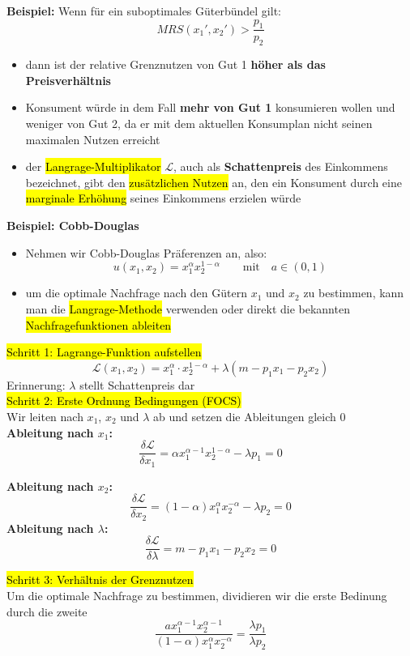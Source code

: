 \documentclass[a4paper, 10pt]{article}
\begin{document}
\textbf{Beispiel:}
Wenn für ein suboptimales Güterbündel gilt:
\[
    MRS(x_1',x_2') > \frac{p_1}{p_2}
\]
\begin{itemize}
    \item dann ist der relative Grenznutzen von Gut 1 \textbf{höher als das Preisverhältnis} 
    \item Konsument würde in dem Fall \textbf{mehr von Gut 1} konsumieren wollen und weniger von Gut 2, da er mit dem aktuellen Konsumplan nicht seinen maximalen Nutzen erreicht
    \item der \hl{Langrage-Multiplikator} $\mathcal{L}$, auch als \textbf{Schattenpreis} des Einkommens bezeichnet, gibt den \hl{zusätzlichen Nutzen} an, den ein Konsument durch eine \hl{marginale Erhöhung} seines Einkommens erzielen würde 
\end{itemize}
\textbf{Beispiel: Cobb-Douglas}
\begin{itemize}
    \item Nehmen wir Cobb-Douglas Präferenzen an, also:
    \[
        u(x_1,x_2) = x_1^\alpha x_2^{1- \alpha}   \qquad \text{mit} \quad a \in (0,1)
    \]

    \item um die optimale Nachfrage nach den Gütern $x_1$ und $x_2$ zu bestimmen, kann man die \hl{Langrage-Methode} verwenden oder direkt die bekannten \hl{Nachfragefunktionen ableiten}
\end{itemize}
\hl{Schritt 1: Lagrange-Funktion aufstellen}
\[
    \mathcal{L}(x_1,x_2) = x_1^\alpha \cdot x_2^{1- \alpha} + \lambda (m - p_1 x_1 - p_2 x_2)
\]  
Erinnerung: $\lambda$ stellt Schattenpreis dar\\[2mm]
\hl{Schritt 2: Erste Ordnung Bedingungen (FOCS)}\\[1.5mm]
Wir leiten nach $x_1$, $x_2$ und $\lambda$ ab und setzen die Ableitungen gleich 0 \\[1.5mm]
\textbf{Ableitung nach $x_1$:}
\[
    \frac{\delta \mathcal{L}}{\delta x_1} = \alpha x_1^{\alpha -1}x_2^{1- \alpha} - \lambda p_1 = 0
\]

\noindent\textbf{Ableitung nach $x_2$:}
\[
    \frac{\delta \mathcal{L}}{\delta x_2} = (1 - \alpha) x_1^\alpha x_2^{- \alpha} - \lambda p_2 = 0
\]
\textbf{Ableitung nach $\lambda$:}
\[
    \frac{\delta \mathcal{L}}{\delta \lambda} = m - p_1 x_1 - p_2 x_2 = 0
\]

\noindent\hl{Schritt 3: Verhältnis der Grenznutzen}\\[1.5mm]
Um die optimale Nachfrage zu bestimmen, dividieren wir die erste Bedinung durch die zweite
\[
    \frac{ax_1^{\alpha - 1} x_2^{\alpha -1}}{(1 - \alpha) x_1^\alpha x_2^{- \alpha}} = \frac{\lambda p_1}{\lambda p_2}
\] 
\end{document}
